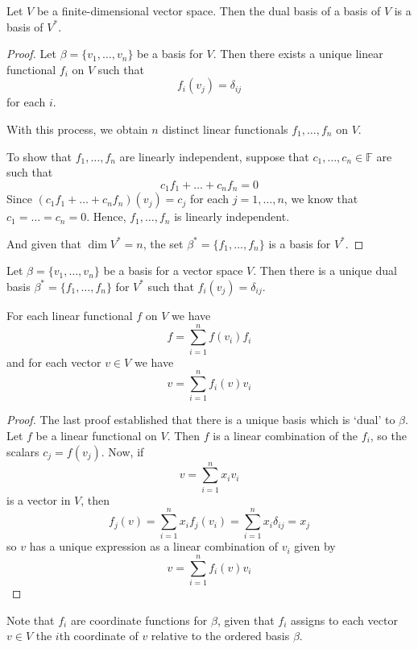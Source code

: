 \begin{theorem}
	Let $V$ be a finite-dimensional vector space. Then the dual basis of a basis of $V$ is a basis of $V^\ast$.
\end{theorem}

\begin{proof}
	Let $\beta = \{ v_1, \ldots, v_n \}$ be a basis for $V$. Then there exists a unique linear functional $f_i$ on $V$ such that
	\[
		f_i(v_j) = \delta_{ij}
	\]
	for each $i$.

	With this process, we obtain $n$ distinct linear functionals $f_1, \ldots, f_n$ on $V$.

	To show that $f_1, \ldots, f_n$ are linearly independent, suppose that $c_1, \ldots, c_n \in \mathbb{F}$ are such that
	\[
		c_1 f_1 + \ldots + c_n f_n = 0
	\]
	Since $(c_1 f_1 + \ldots + c_n f_n)(v_j) = c_j$ for each $j = 1, \ldots, n$, we know that $c_1 = \ldots = c_n = 0$. Hence, $f_1, \ldots, f_n$ is linearly independent.
	
	And given that $\dim V^\ast = n$, the set $\beta^\ast = \{ f_1, \ldots, f_n \}$ is a basis for $V^\ast$.
\end{proof}

\begin{theorem}
	Let $\beta = \{ v_1, \ldots, v_n \}$ be a basis for a vector space $V$. Then there is a unique dual basis $\beta^\ast = \{ f_1, \ldots, f_n \}$ for $V^\ast$ such that $f_i (v_j) = \delta_{ij}$.
	
	For each linear functional $f$ on $V$ we have
	\[
		f = \sum_{i=1}^n f(v_i) f_i
	\]
	and for each vector $v \in V$ we have
	\[
		v = \sum_{i=1}^n f_i(v) v_i
	\]
\end{theorem}

\begin{proof}
	The last proof established that there is a unique basis which is `dual' to $\beta$. Let $f$ be a linear functional on $V$. Then $f$ is a linear combination of the $f_i$, so the scalars $c_j = f(v_j)$. Now, if
	\[
		v = \sum_{i=1}^n x_i v_i
	\]
	is a vector in $V$, then
	\[
		f_j(v) = \sum_{i=1}^n x_i f_j(v_i) = \sum_{i=1}^n x_i \delta_{ij} = x_j
	\]
	so $v$ has a unique expression as a linear combination of $v_i$ given by
	\[
		v = \sum_{i=1}^n f_i(v) v_i
	\]
\end{proof}

Note that $f_i$ are coordinate functions for $\beta$, given that $f_i$ assigns to each vector $v \in V$ the $i$th coordinate of $v$ relative to the ordered basis $\beta$.

